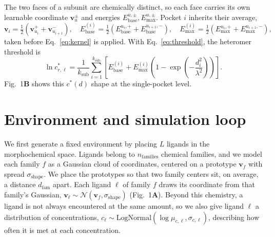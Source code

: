 \documentclass[aps,pre,superscriptaddress,floatfix,longbibliography,linenumbers]{revtex4-2}
\begin{document}
The two faces of a subunit are chemically distinct, so each face carries its
own learnable coordinate $\mathbf v_u^{\pm}$ and energies
$E_\text{base}^{u,\pm},E_\text{max}^{u,\pm}$. Pocket $i$ inherits their
average,
\begin{equation}
\mathbf v_i = \tfrac12\left(\mathbf v_{u_i}^{+}+\mathbf v_{u_{i+1}}^{-}\right),
\quad
E_\text{base}^{(i)} = \tfrac12\left(E_\text{base}^{u_i,+}+E_\text{base}^{u_{i+1},-}\right),
\quad
E_\text{max}^{(i)} = \tfrac12\left(E_\text{max}^{u_i,+}+E_\text{max}^{u_{i+1},-}\right),
\label{eq:pocket}
\end{equation}
taken before Eq.~\eqref{eq:kernel} is applied. With Eq.~\eqref{eq:threshold},
the heteromer threshold is
\begin{equation}
\ln c^*_{r,\ell} = \frac{1}{k_\text{sub}}\sum_{i=1}^{k_\text{sub}}
\left[E_\text{base}^{(i)} + E_\text{max}^{(i)}\left(1-\exp\left(-\frac{d_i^2}{\lambda^2}\right)\right)\right].
\label{eq:threshold_full}
\end{equation}
Fig.~1\textbf{B} shows this $c^*(d)$ shape at the single-pocket level.

\section{Environment and simulation loop}
\label{sec:env}

We first generate a fixed environment by placing $L$ ligands in the
morphochemical space. Ligands belong to $n_\text{families}$ chemical
families, and we model each family $f$ as a Gaussian cloud of coordinates,
centered on a prototype $\mathbf v_f$ with spread $\sigma_\text{shape}$. We
place the prototypes so that two family centers sit, on average, a distance
$d_\text{fam}$ apart. Each ligand $\ell$ of family $f$ draws its coordinate
from that family's Gaussian,
$\mathbf v_\ell \sim \mathcal N(\mathbf v_f,\sigma_\text{shape})$
(Fig.~1\textbf{A}). Beyond this chemistry, a ligand is not always encountered
at the same amount, so we also give ligand $\ell$ a distribution of
concentrations,
$c_\ell\sim\text{LogNormal}(\log\mu_{c,\ell},\sigma_{c,\ell})$, describing
how often it is met at each concentration.
\end{document}
